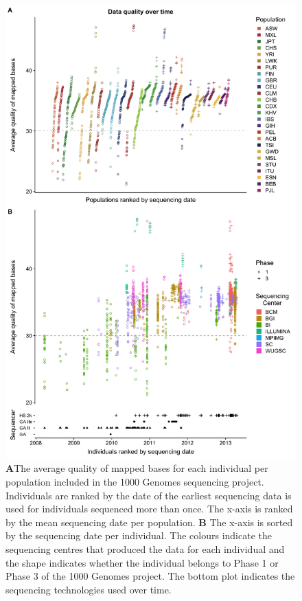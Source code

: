 \documentclass[9pt,lineno]{elife}
\begin{document}
\begin{figure}
\includegraphics[width=0.95\hsize,keepaspectratio]{./Figures/MapQualOverTime.jpg}

\caption{\textbf{A}The average quality of mapped bases for each individual per population included in the 1000 Genomes sequencing project. Individuals are ranked by the date of the earliest sequencing data is used for individuals sequenced more than once. The x-axis is ranked by the mean sequencing date per population. \textbf{B} The x-axis is sorted by the sequencing date per individual. The colours indicate the sequencing centres that produced the data for each individual and the shape indicates whether the individual belongs to Phase 1 or Phase 3 of the 1000 Genomes project. The bottom plot indicates the sequencing technologies used over time.}
\label{MapQual}
\end{figure}
\end{document}
